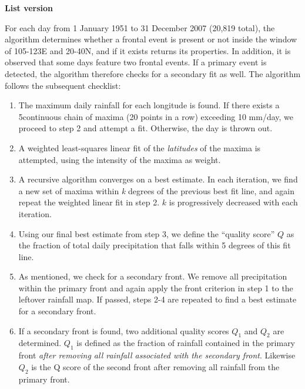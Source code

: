 \documentclass[draft,grl]{AGUTeX}
\begin{document}
\begin{article}
\textbf{List version}

For each day from 1 January 1951 to 31 December 2007 (20,819 total), the algorithm determines whether a frontal event is present or not inside the window of 105-123E and 20-40N, and if it exists returns its properties. In addition, it is observed that some days feature two frontal events. If a primary event is detected, the algorithm therefore checks for a secondary fit as well. The algorithm follows the subsequent checklist:

\begin{enumerate}
	\item The maximum daily rainfall for each longitude is found. If there exists a 5\textdegree continuous chain of maxima (20 points in a row) exceeding 10 mm/day, we proceed to step 2 and attempt a fit. Otherwise, the day is thrown out.
	
	\item A weighted least-squares linear fit of the \textit{latitudes} of the maxima is attempted, using the intensity of the maxima as weight.
	
	\item A recursive algorithm converges on a best estimate. In each iteration, we find a new set of maxima within \textit{k} degrees of the previous best fit line, and again repeat the weighted linear fit in step 2. $k$ is progressively decreased with each iteration.
	
	\item Using our final best estimate from step 3, we define the ``quality score'' $Q$ as the fraction of total daily precipitation that falls within 5 degrees of this fit line.
	
	\item As mentioned, we check for a secondary front. We remove all precipitation within the primary front and again apply the front criterion in step 1 to the leftover rainfall map. If passed, steps 2-4 are repeated to find a best estimate for a secondary front.
	
	\item If a secondary front is found, two additional quality scores $Q_1$ and $Q_2$ are determined. $Q_1$ is defined as the fraction of rainfall contained in the primary front \textit{after removing all rainfall associated with the secondary front}. Likewise $Q_2$ is the Q score of the second front after removing all rainfall from the primary front.		
	
\end{enumerate} 
	

\end{article}
\end{document}
